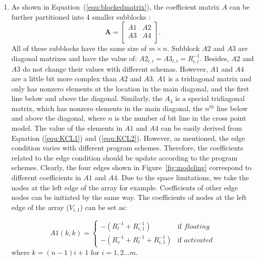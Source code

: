 \begin{enumerate}
  \item
  As shown in Equation~(\ref{equ:blockedmatrix}), the coefficient matrix $A$ can be further partitioned into 4 smaller subblocks :
    \begin{equation}\label{equ:blockedmatrix}
        \mathbf{A} = \left[
        \begin{array}{cc}
            A1 & A2  \\
            A3 & A4  \\
        \end{array} \right].
    \end{equation}
All of these subblocks have the same size of $m\times n$. Subblock $A2$ and $A3$ are diagonal matrixes and have the value of: $A2_{i,i} = A3_{i,i} = R_{i,i}^{-1}$. Besides, $A2$ and $A3$ do not change their values with different schemas. However, $A1$ and $A4$ are a little bit more complex than $A2$ and $A3$. $A1$ is a tridiagonal matrix and only has nonzero elements at the location in the main diagonal, and the first line below and above the diagonal. Similarly, the $A_4$ is a special tridiagonal matrix, which has nonzero elements in the main diagonal, the $n^{th}$ line below and above the diagonal, where $n$ is the number of bit line in the cross point model.
The value of the elements in $A1$ and $A4$ can be easily derived from Equation (\ref{equ:KCL1}) and (\ref{equ:KCL2}). However, as mentioned, the edge condition varies with different program schemes. Therefore, the coefficients related to the edge condition should be update according to the program schemes. Clearly, the four edges shown in Figure~\ref{fig:modeling} correspond to different coefficients in $A1$ and $A4$. Due to the space limitations, we take the nodes at the left edge of the array for example. Coefficients of other edge nodes can be initiated by the same way. The coefficients of nodes at the left edge of the array ($V_{i,1}$) can be set as:


    \begin{equation}
    A1(k,k) = \left\{
    \begin{array}{ll}
    -(R_l^{-1}+R_{i,1}^{-1})   & \text{if } floating\\
    -(R_v^{-1}+R_l^{-1}+R_{i,1}^{-1})& \text{if } activated
    \end{array} \right.
    \end{equation}
    where $k=(n-1)i+1$ for $i=1,2...m$.


\end{enumerate}
